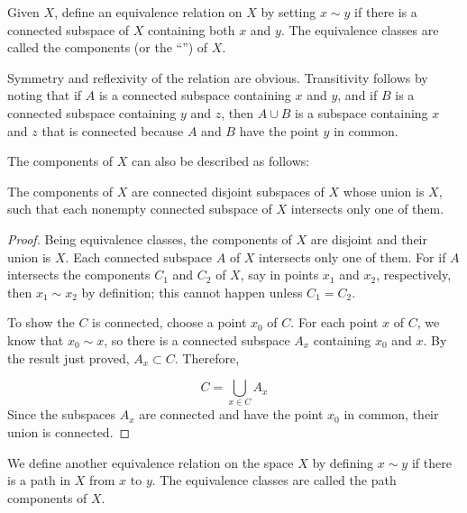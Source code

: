 \begin{definition}
 Given \(X\), define an equivalence relation on \(X\) by setting \(x \sim y\) if there is a connected subspace of \(X\) containing both \(x\) and \(y\). The equivalence classes are called the components (or the ``'') of \(X\).
\end{definition}

Symmetry and reflexivity of the relation are obvious. Transitivity follows by noting that if \(A\) is a connected subspace containing \(x\) and \(y\), and if \(B\) is a connected subspace containing \(y\) and \(z\), then \(A \cup B\) is a subspace containing \(x\) and \(z\) that is connected because \(A\) and \(B\) have the point \(y\) in common.

The components of \(X\) can also be described as follows:

\begin{theorem}
\label{thm:\thetheorem}
 The components of \(X\) are connected disjoint subspaces of \(X\) whose union is \(X\), such that each nonempty connected subspace of \(X\) intersects only one of them.

\end{theorem}
\begin{proof}
Being equivalence classes, the components of \(X\) are disjoint and their union is \(X\). Each connected subspace \(A\) of \(X\) intersects only one of them. For if \(A\) intersects the components \(C_{1}\) and \(C_{2}\) of \(X\), say in points \(x_{1}\) and \(x_{2}\), respectively, then \(x_{1} \sim {x}_{2}\) by definition; this cannot happen unless \(C_{1} = C_{2}\).


To show the  \(C\) is connected, choose a point \(x_{0}\) of \(C\). For each point \(x\) of \(C\), we know that \(x_{0} \sim x\), so there is a connected subspace \(A_{x}\) containing \(x_{0}\) and \(x\). By the result just proved, \(A_{x} \subset C\). Therefore,

\[
C = \mathop{\bigcup }\limits_{{x \in C}}A_{x}
\]
Since the subspaces \(A_{x}\) are connected and have the point \(x_{0}\) in common, their union is connected.
\end{proof}

\begin{definition}
 We define another equivalence relation on the space \(X\) by defining \(x \sim y\) if there is a path in \(X\) from \(x\) to \(y\). The equivalence classes are called the path components of \(X\).
\end{definition}

